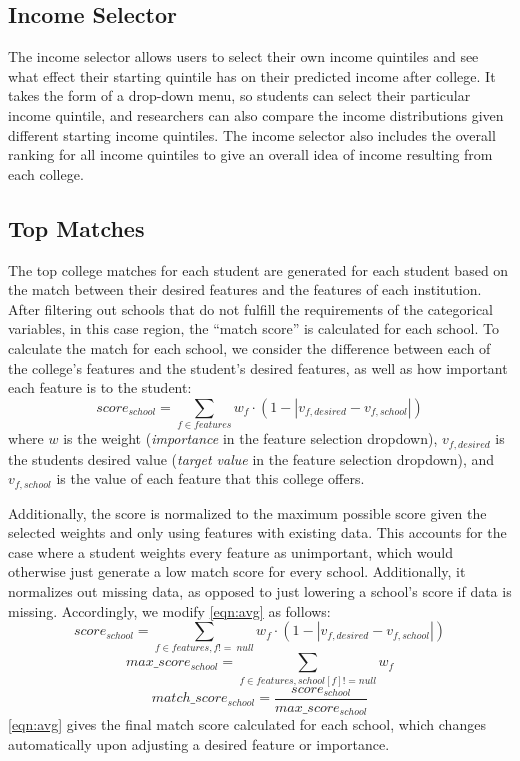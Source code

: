\documentclass{vgtc}
\begin{document}
\subsection{Income Selector}
The income selector allows users to select their own income quintiles and see what effect their starting quintile has on their predicted income after college. It takes the form of a drop-down menu, so students can select their particular income quintile, and researchers can also compare the income distributions given different starting income quintiles. The income selector also includes the overall ranking for all income quintiles to give an overall idea of income resulting from each college.

\subsection{Top Matches}
The top college matches for each student are generated for each student based on the match between their desired features and the features of each institution. After filtering out schools that do not fulfill the requirements of the categorical variables, in this case region, the ``match score'' is calculated for each school. To calculate the match for each school, we consider the difference between each of the college's features and the student's desired features, as well as how important each feature is to the student:
\begin{equation}
    score_{school} = \sum_{f \in features} w_{f} \cdot (1-|v_{f, desired} - v_{f, school}|)
    \label{eqn:avg}
\end{equation}
where $w$ is the weight (\textit{importance} in the feature selection dropdown), $v_{f, desired}$ is the students desired value (\textit{target value} in the feature selection dropdown), and $v_{f,school}$ is the value of each feature that this college offers.

Additionally, the score is normalized to the maximum possible score given the selected weights and only using features with existing data. This accounts for the case where a student weights every feature as unimportant, which would otherwise just generate a low match score for every school. Additionally, it normalizes out missing data, as opposed to just lowering a school's score if data is missing. Accordingly, we modify \autoref{eqn:avg} as follows:
\begin{equation}
    score_{school} = \sum_{f \in features,f!=\ null} w_{f} \cdot (1-|v_{f, desired} - v_{f, school}|)
\end{equation}
\begin{equation}    
    max\_score_{school} = \sum_{f \in features,school[f]!=null} w_{f}
\end{equation}
\begin{equation}    
    match\_score_{school} = \frac{score_{school}}{max\_score_{school}}
    \label{eqn:match}
\end{equation}
\autoref{eqn:avg} gives the final match score calculated for each school, which changes automatically upon adjusting a desired feature or importance.
\end{document}
